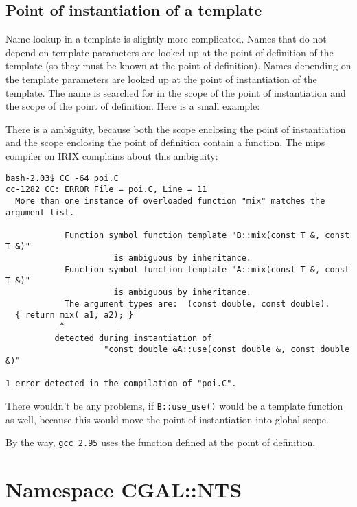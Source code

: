 \subsection{Point of instantiation of a template}
Name lookup in a template is slightly more complicated.
Names that do not depend on template parameters are looked up at the point
of definition of the template%
(so they must be known at the point of definition). 
Names depending on the template parameters are looked up at
the point of instantiation%
 of the template. 
The name is searched for in the
scope of the point of instantiation and the scope of the
point of definition. Here is a small example:


There is a ambiguity, because both the scope enclosing the point of 
instantiation and the scope enclosing the point of definition contain
a  function. The mips compiler on {\sc IRIX} 
complains about this ambiguity: 

{\small
\begin{verbatim}
bash-2.03$ CC -64 poi.C 
cc-1282 CC: ERROR File = poi.C, Line = 11
  More than one instance of overloaded function "mix" matches the argument list.

            Function symbol function template "B::mix(const T &, const T &)"
                      is ambiguous by inheritance.
            Function symbol function template "A::mix(const T &, const T &)"
                      is ambiguous by inheritance.
            The argument types are:  (const double, const double).
  { return mix( a1, a2); }
           ^
          detected during instantiation of
                    "const double &A::use(const double &, const double &)" 

1 error detected in the compilation of "poi.C".
\end{verbatim}
}
There wouldn't be any problems, if \verb+B::use_use()+ would be a template
function as well, because this would move the point of instantiation
into global scope.

By the way, \verb+gcc 2.95+ uses the function defined at the 
point of definition.

\section{Namespace CGAL::NTS}

